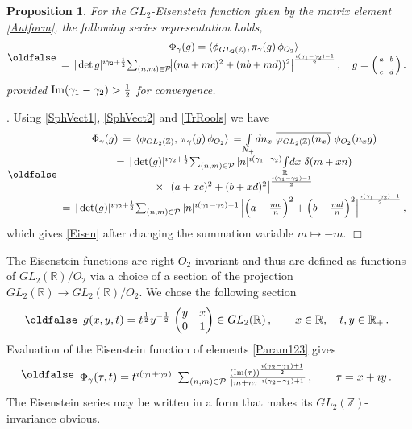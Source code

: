 \documentclass[12pt]{article}
\def\IR{\mathbb{R}}
\def\IZ{\mathbb{Z}}
\def\CP {\mathcal{P}}
\def\g {{\gamma}}
\def\c{\cdot}
\def\ov {{\overline}}
\def\<{\langle}
\def\>{\rangle}
\def\ov{\overline}
\newtheorem{prop}{Proposition}[section]           %
\newcommand{\proof}{\noindent {\it Proof}. }
\def\be{\begin{eqnarray}\new\begin{array}{cc}}
\def\ee{\end{array}\end{eqnarray}}
\def\i{\imath}
\begin{document}
\begin{prop} For the $GL_2$-Eisenstein function given by the matrix element \eqref{Autform}, the following series representation holds,
  \be\label{Eisen}
   \Phi_\gamma(g)=\<\phi_{GL_2(\IZ)}, \pi_\gamma(g)\, \phi_{O_2}\>\\
   =\,|\det g|^{\imath \gamma_2+\frac{1}{2}}\!
   \sum_{(n,m)\in\CP}\!
  \bigl|(na+mc)^2+(nb+md))^2\bigr|^{\frac{\imath(\gamma_1-\gamma_2)-1}{2}}\,, \quad
  g=\Big(\begin{smallmatrix}a&&b\\&&\\c&&d\end{smallmatrix}\Big)\,.
 \ee
provided ${\rm Im}(\g_1-\g_2)>\frac{1}{2}$ for convergence.
\end{prop}

\proof Using \eqref{SphVect1}, \eqref{SphVect2} and \eqref{TrRools} we
have
 \be
  \Phi_{\gamma}(g)\,
  =\,\<\phi_{GL_2(\IZ)},\,\pi_\gamma(g)\,\phi_{O_2}\>\,
  =\!\int\limits_{N_+}\!dn_x\,\,\ov{\varphi_{GL_2(\IZ)}(n_x)}\,\,\phi_{O_2}(n_xg)\\
  =\,|\det(g)|^{\i\g_2+\frac{1}{2}}\!\sum_{(n,m)\in\CP}
  |n|^{\i(\g_1-\g_2)}\!
  \int\limits_{\IR}\!dx\,\,\delta(m+xn)\\
  \times\,\,\bigl|(a+xc)^2+(b+xd)^2\bigr|^{\frac{\i(\g_1-\g_2)-1}{2}}\\
  =\,|\det(g)|^{\i\g_2+\frac{1}{2}}\!\sum_{(n,m)\in\CP}
  |n|^{\i(\g_1-\g_2)-1}\,
  \Big|\Big(a-\frac{mc}{n}\Big)^2+\Big(b-\frac{md}{n}\Big)^2
  \Big|^{\frac{\i(\g_1-\g_2)-1}{2}}\,,

 \ee
which gives \eqref{Eisen} after changing the summation variable $m\mapsto-m$. $\Box$

The Eisenstein functions are right $O_2$-invariant and thus are
defined as functions of $GL_2(\IR)/O_2$ via a choice of a section of
the projection $GL_2(\IR)\to GL_2(\IR)/O_2$. We chose the following
section
 \be\label{Param123}
  g(x,y,t)=t^{\frac{1}{2}}y^{-\frac{1}{2}}\,\begin{pmatrix} y & x\\0&1\end{pmatrix}\in
  GL_2(\IR)\,, \qquad x\in \IR, \quad t,y\in \IR_+\,.
 \ee
Evaluation  of the Eisenstein function of elements \eqref{Param123}
gives
 \be\label{EisenRed}
  \Phi_\gamma(\tau,t)=t^{\imath(\gamma_1+\gamma_2)}\,\,
  \sum_{(n,m)\in\CP}
  \frac{({\rm Im}(\tau))^{\frac{\i(\g_2-\g_1)+1}{2}}}
  {|m+n\tau|^{\i(\g_2-\g_1)+1}}\,,\qquad \tau=x+\imath y\,.
 \ee
The Eisenstein series may be written in a form that makes its
$GL_2(\IZ)$-invariance obvious.
\end{document}
